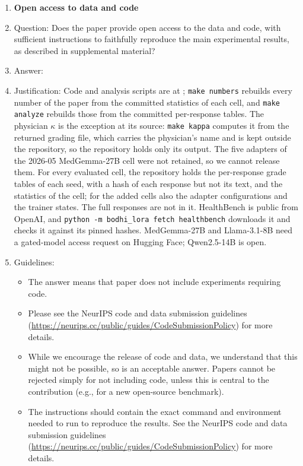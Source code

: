 \begin{enumerate}
\item {\bf Open access to data and code}
    \item[] Question: Does the paper provide open access to the data and code, with sufficient instructions to faithfully reproduce the main experimental results, as described in supplemental material?
    \item[] Answer: \answerYes{}
    \item[] Justification: Code and analysis scripts are at \codeurl{}; \texttt{make numbers} rebuilds every number of the paper from the committed statistics of each cell, and \texttt{make analyze} rebuilds those from the committed per-response tables. The physician $\kappa$ is the exception at its source: \texttt{make kappa} computes it from the returned grading file, which carries the physician's name and is kept outside the repository, so the repository holds only its output. The five adapters of the 2026-05 MedGemma-27B cell were not retained, so we cannot release them. For every evaluated cell, the repository holds the per-response grade tables of each seed, with a hash of each response but not its text, and the statistics of the cell; for the added cells also the adapter configurations and the trainer states. The full responses are not in it. HealthBench is public from OpenAI, and \texttt{python -m bodhi\_lora fetch healthbench} downloads it and checks it against its pinned hashes. MedGemma-27B and Llama-3.1-8B need a gated-model access request on Hugging Face; Qwen2.5-14B is open.
    \item[] Guidelines:
    \begin{itemize}
        \item The answer \answerNA{} means that paper does not include experiments requiring code.
        \item Please see the NeurIPS code and data submission guidelines (\url{https://neurips.cc/public/guides/CodeSubmissionPolicy}) for more details.
        \item While we encourage the release of code and data, we understand that this might not be possible, so \answerNo{} is an acceptable answer. Papers cannot be rejected simply for not including code, unless this is central to the contribution (e.g., for a new open-source benchmark).
        \item The instructions should contain the exact command and environment needed to run to reproduce the results. See the NeurIPS code and data submission guidelines (\url{https://neurips.cc/public/guides/CodeSubmissionPolicy}) for more details.

\end{itemize}
\end{enumerate}
